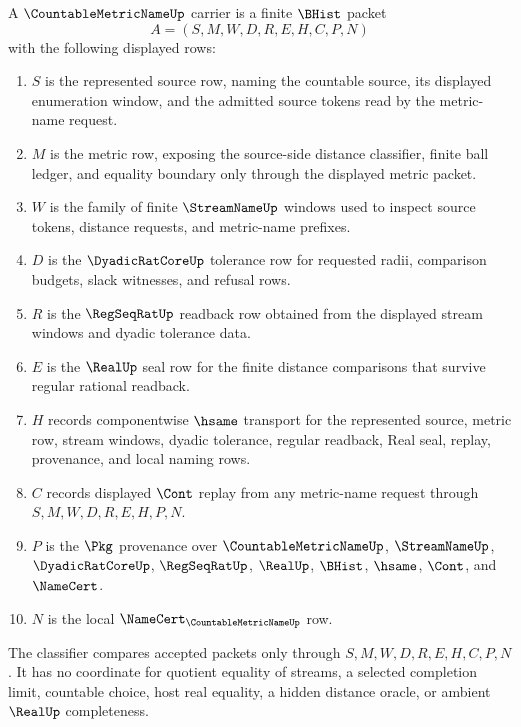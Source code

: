 \begin{definition}
\label{def:countable-metric-name-carrier}
A $\CountableMetricNameUp$ carrier is a finite $\BHist$ packet
$$
A=(S,M,W,D,R,E,H,C,P,N)
$$
with the following displayed rows:
\begin{enumerate}
\item $S$ is the represented source row, naming the countable source, its displayed enumeration window, and the admitted source tokens read by the metric-name request.
\item $M$ is the metric row, exposing the source-side distance classifier, finite ball ledger, and equality boundary only through the displayed metric packet.
\item $W$ is the family of finite $\StreamNameUp$ windows used to inspect source tokens, distance requests, and metric-name prefixes.
\item $D$ is the $\DyadicRatCoreUp$ tolerance row for requested radii, comparison budgets, slack witnesses, and refusal rows.
\item $R$ is the $\RegSeqRatUp$ readback row obtained from the displayed stream windows and dyadic tolerance data.
\item $E$ is the $\RealUp$ seal row for the finite distance comparisons that survive regular rational readback.
\item $H$ records componentwise $\hsame$ transport for the represented source, metric row, stream windows, dyadic tolerance, regular readback, Real seal, replay, provenance, and local naming rows.
\item $C$ records displayed $\Cont$ replay from any metric-name request through $S,M,W,D,R,E,H,P,N$.
\item $P$ is the $\Pkg$ provenance over $\CountableMetricNameUp$, $\StreamNameUp$, $\DyadicRatCoreUp$, $\RegSeqRatUp$, $\RealUp$, $\BHist$, $\hsame$, $\Cont$, and $\NameCert$.
\item $N$ is the local $\NameCert_{\CountableMetricNameUp}$ row.
\end{enumerate}
The classifier compares accepted packets only through $S,M,W,D,R,E,H,C,P,N$. It has no coordinate for quotient equality of streams, a selected completion limit, countable choice, host real equality, a hidden distance oracle, or ambient $\RealUp$ completeness.
\end{definition}

